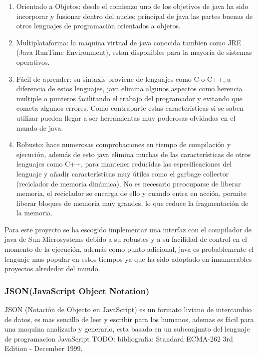 \begin{enumerate}
	
	\item Orientado a Objetos: desde el comienzo uno de los objetivos de java ha sido incorporar y fusionar dentro del nucleo principal de java las partes buenas de otros lenguajes de programación orientados a objetos.
	
	\item Multiplataforma: la maquina virtual de java conocida tambien como JRE (Java RunTime Environment), estan disponibles para la mayoria de sistemas operativos.
	
	\item Fácil de aprender: su sintaxis proviene de lenguajes como C o C++, a diferencia de estos lenguajes, java elimina algunos aspectos como herencia multiple o punteros facilitando el trabajo del programador y evitando que cometa algunos errores. Como contraparte estas características si se saben utilizar pueden llegar a ser herramientas muy poderosas olvidadas en el mundo de java.
	
	\item Robusto: hace numerosas comprobaciones en tiempo de compilación y ejecución, además de esto java elimina muchas de las características de otros lenguajes como C++, para mantener reducidas las especificaciones del lenguaje y añadir características muy útiles como el garbage collector (reciclador de memoria dinámica). No es necesario preocuparse de liberar memoria, el reciclador se encarga de ello y cuando entra en acción, permite liberar bloques de memoria muy grandes, lo que reduce la fragmentación de la memoria.
	
\end{enumerate}

Para este proyecto se ha escogido implementar una interfaz con el compilador de java de Sun Microsystems debido a su robustes y a su facilidad de control en el momento de la ejecución, además como punto adicional, java es probablemente el lenguaje mas popular en estos tiempos ya que ha sido adoptado en innumerables proyectos alrededor del mundo.


\subsubsection*{JSON(JavaScript Object Notation) \cite{json} }

JSON (Notación de Objecto en JavaScript) es un formato liviano de intercambio de datos, es mas sencillo de leer y escribir para los humanos, ademas es fácil para una maquina analizarlo y generarlo, esta basado en un subconjunto del lenguaje de programacion JavaScript TODO: bibliografia: Standard ECMA-262 3rd Edition - December 1999.

